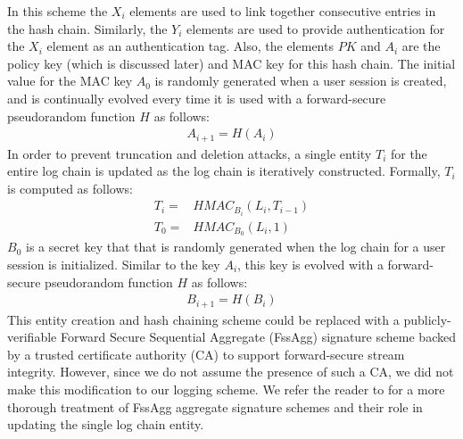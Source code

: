 \documentclass{sig-alternate}
\begin{document}
In this scheme the $X_i$ elements are used to link together consecutive entries in 
the hash chain. Similarly, the $Y_i$ elements are used to provide authentication 
for the $X_i$ element as an authentication tag. Also, the elements $PK$ and $A_i$
are the policy key (which is discussed later) and MAC key for this hash chain. The 
initial value for the MAC key $A_0$ is randomly generated when a user session is 
created, and is continually evolved every time it is used with a forward-secure
pseudorandom function $H$ as follows:
\begin{align*}
A_{i+1} = H(A_i)
\end{align*}
In order to prevent truncation and deletion attacks, a single entity $T_i$ for the entire log 
chain is updated as the log chain is iteratively constructed. Formally, $T_i$ is
computed as follows:
\begin{align*}
T_i = & HMAC_{B_i}(L_{i}, T_{i - 1}) \\
T_0 = & HMAC_{B_0}(L_{i}, 1)
\end{align*}
$B_0$ is a secret key that that is randomly generated when the log chain for a user session
is initialized. Similar to the key $A_i$, this key is evolved with a forward-secure pseudorandom function 
$H$ as follows:
\begin{align*}
B_{i+1} = H(B_i)
\end{align*}
This entity creation and hash chaining scheme could be replaced with a publicly-verifiable Forward Secure 
Sequential Aggregate (FssAgg) signature scheme backed by a trusted certificate authority (CA) to support 
forward-secure stream integrity. However, since we do not assume the presence of such a CA, we did
not make this modification to our logging scheme. We refer the reader to \cite{Ma2008-FssAgg} for a more thorough treatment of FssAgg aggregate signature schemes and their role in updating the single log chain entity. 


\end{document}
